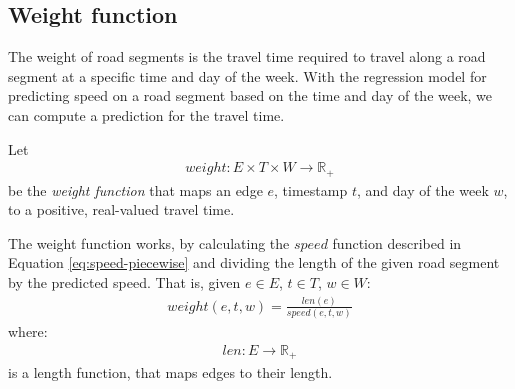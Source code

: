 

\subsection{Weight function}\label{sec:weight-function}
The weight of road segments is the travel time required to travel along a road segment at a specific time and day of the week. With the regression model for predicting speed on a road segment based on the time and day of the week, we can compute a prediction for the travel time.

Let
\begin{align}
weight: E \times T \times W \rightarrow \mathbb{R_+}
\end{align}
be the \emph{weight function} that maps an edge $e$, timestamp $t$, and day of the week $w$, to a positive, real-valued travel time.

The weight function works, by calculating the $speed$ function described in Equation \ref{eq:speed-piecewise} and dividing the length of the given road segment by the predicted speed. That is, given $e \in E$, $t \in T$, $w \in W$:
\begin{align}
weight(e,t,w) = \frac{len(e)}{speed(e,t,w)}
\end{align}
where:
\begin{align}
len:E \rightarrow \mathbb{R_+}
\end{align}
is a length function, that maps edges to their length.
